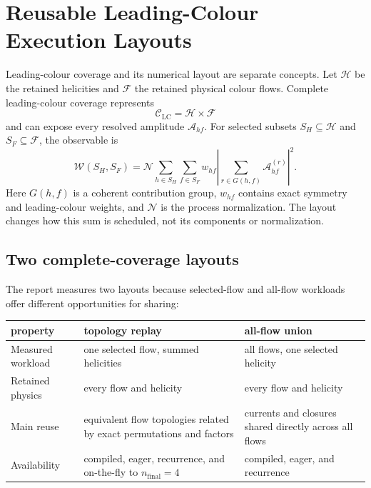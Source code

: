 \section{Reusable Leading-Colour Execution Layouts}
\label{sec:lc-flow-layouts}

Leading-colour coverage and its numerical layout are separate concepts.  Let
\(\mathcal H\) be the retained helicities and \(\mathcal F\) the retained
physical colour flows.  Complete leading-colour coverage represents
\begin{equation}
  \mathcal C_{\mathrm{LC}}=\mathcal H\times\mathcal F
  \label{eq:lc-complete-coverage}
\end{equation}
and can expose every resolved amplitude \(\mathcal A_{hf}\).  For selected
subsets \(S_H\subseteq\mathcal H\) and \(S_F\subseteq\mathcal F\), the
observable is
\begin{equation}
  \mathcal W(S_H,S_F)
  =\mathcal N\sum_{h\in S_H}\sum_{f\in S_F}w_{hf}
   \left|\sum_{r\in G(h,f)}\mathcal A^{(r)}_{hf}\right|^2 .
  \label{eq:lc-runtime-selection}
\end{equation}
Here \(G(h,f)\) is a coherent contribution group, \(w_{hf}\) contains exact
symmetry and leading-colour weights, and \(\mathcal N\) is the process
normalization.  The layout changes how this sum is scheduled, not its
components or normalization.

\subsection{Two complete-coverage layouts}

The report measures two layouts because selected-flow and all-flow workloads
offer different opportunities for sharing:

\begin{center}
\small
\begin{tabular}{@{}L{1.32in}L{2.40in}L{2.40in}@{}}
\toprule
\textbf{property} & \textbf{topology replay} &
  \textbf{all-flow union} \\
\midrule
Measured workload & one selected flow, summed helicities &
  all flows, one selected helicity \\
Retained physics & every flow and helicity &
  every flow and helicity \\
Main reuse & equivalent flow topologies related by exact permutations and
  factors & currents and closures shared directly across all flows \\
Availability & compiled, eager, recurrence, and on-the-fly to
  \(n_{\mathrm{final}}=4\) &
  compiled, eager, and recurrence \\
\bottomrule
\end{tabular}
\end{center}

